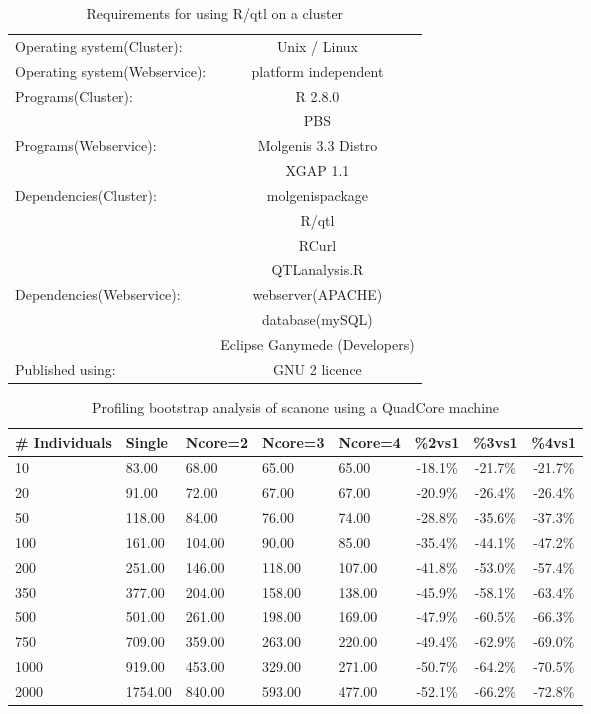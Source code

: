 \begin{table}[ht]
	\caption{Requirements for using R/qtl on a cluster}
	\centering
	\begin{tabular}{| l | c | }
	\hline
	Operating system(Cluster):&Unix / Linux\\
	Operating system(Webservice):&platform independent\\
	Programs(Cluster):&R 2.8.0\\
	&PBS\\
	Programs(Webservice):&Molgenis 3.3 Distro\\
	&XGAP 1.1\\
	Dependencies(Cluster):&molgenispackage\\
	&R/qtl\\
	&RCurl\cite{Rcurl08}\\
	&QTLanalysis.R\\
	Dependencies(Webservice):&webserver(APACHE)\\
	&database(mySQL)\\
	&Eclipse Ganymede (Developers)\\
	Published using:&GNU 2 licence\\
	\hline
	\end{tabular}
	\label{tbl:tabelCluster}
\end{table}

\begin{table}[ht]
	\caption{Profiling bootstrap analysis of scanone using a QuadCore machine}
	\centering
	\begin{tabular}{| l | l | l | l | l | c | c | c |}
	\hline
	\# Individuals & Single & Ncore=2 & Ncore=3 & Ncore=4 & \%2vs1 & \%3vs1 & \%4vs1\\
	\hline
	\hline
	10 & 83.00 & 68.00 & 65.00 & 65.00 & -18.1\% & -21.7\% & -21.7\%\\
	20 & 91.00 & 72.00 & 67.00 & 67.00 & -20.9\% & -26.4\% & -26.4\%\\
	50 & 118.00 & 84.00 & 76.00 & 74.00 & -28.8\% & -35.6\% & -37.3\%\\
	100	& 161.00 & 104.00 & 90.00 & 85.00 & -35.4\% & -44.1\% & -47.2\%\\
	200	& 251.00 & 146.00 & 118.00 & 107.00 & -41.8\% & -53.0\% & -57.4\%\\
	350	& 377.00 & 204.00 & 158.00 & 138.00 & -45.9\% & -58.1\% & -63.4\%\\
	500	& 501.00 & 261.00 & 198.00 & 169.00 & -47.9\% & -60.5\% & -66.3\%\\
	750	& 709.00 & 359.00 & 263.00 & 220.00 & -49.4\% & -62.9\% & -69.0\%\\
	1000 & 919.00 & 453.00 & 329.00 & 271.00 & -50.7\% & -64.2\% & -70.5\%\\
	2000 & 1754.00 & 840.00 & 593.00 & 477.00 & -52.1\% & -66.2\% & -72.8\%\\
	\hline
	\end{tabular}
	\label{tbl:tabel3}
\end{table}

